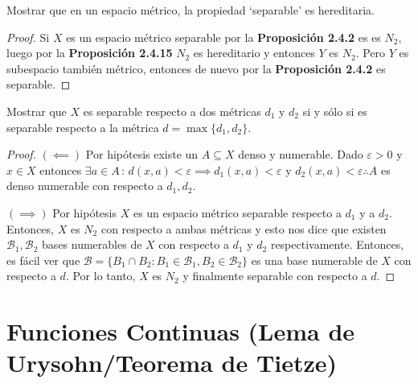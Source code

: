 \documentclass{article}
\theoremstyle{plain}
\theoremstyle{definition}
\newenvironment{ejercicio}[1]{\begin{trivlist}
\item[\hskip \labelsep {\bfseries Ejercicio}\hskip \labelsep {\bfseries #1.}]}{\end{trivlist}}
\begin{document}
\begin{ejercicio}{7}
    Mostrar que en un espacio métrico, la propiedad `separable' es hereditaria.
\end{ejercicio}
\begin{proof}
    Si \( X \) es un espacio métrico separable por la \textbf{Proposición 2.4.2} es es \( N_2 \), luego por la \textbf{Proposición 2.4.15} \( N_2 \) es hereditario y entonces \( Y \) es \( N_2 \). Pero \( Y \) es subespacio también métrico, entonces de nuevo por la \textbf{Proposición 2.4.2} es separable.
\end{proof}

\begin{ejercicio}{8}
    Mostrar que \( X \) es separable respecto a dos métricas \( d_1 \) y \( d_2 \) si y sólo si es separable respecto a la métrica \( d = \max \{ d_1, d_2 \} \).
\end{ejercicio}
\begin{proof}
    \( (\impliedby) \) Por hipótesis existe un \( A \subseteq X \) denso y numerable. Dado \( \varepsilon > 0 \) y \( x \in X \) entonces \( \exists a \in A \, : \, d(x, a) < \varepsilon \implies d_1(x, a) < \varepsilon \) y \( d_2(x, a) < \varepsilon \therefore A \) es denso numerable con respecto a \( d_1, d_2 \).

    \( (\implies) \) Por hipótesis \( X \) es un espacio métrico separable respecto a \( d_1 \) y a \( d_2 \). Entonces, \( X \) es \( N_2 \) con respecto a ambas métricas y esto nos dice que existen \( \mathcal{B}_1, \mathcal{B}_2  \) bases numerables de \( X \) con respecto a \( d_1 \) y \( d_2 \) respectivamente. Entonces, es fácil ver que \( \mathcal{B} = \{ B_1 \cap B_2 : B_1 \in \mathcal{B}_1, B_2 \in \mathcal{B}_2 \} \) es una base numerable de \( X \) con respecto a \( d \).
    Por lo tanto, \( X \) es \( N_2 \) y finalmente separable con respecto a \( d \).
\end{proof}

\clearpage

\section*{Funciones Continuas (Lema de Urysohn/Teorema de Tietze)}
\end{document}
